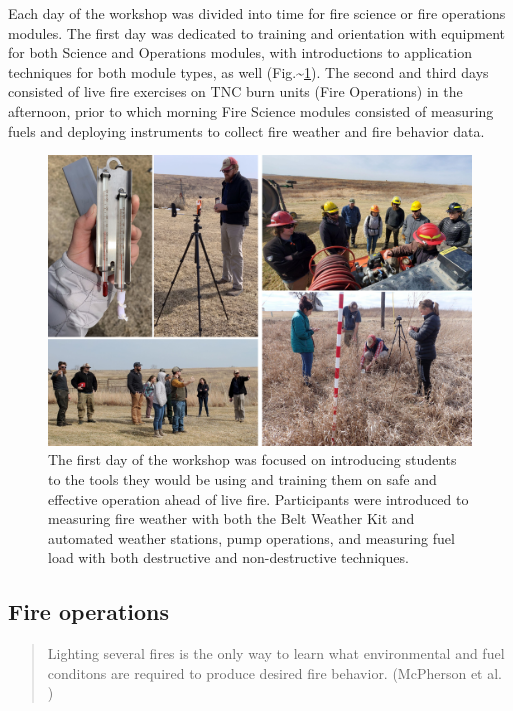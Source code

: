 \documentclass[fire,article,submit,moreauthors,pdftex]{Definitions/mdpi}
\begin{document}
Each day of the workshop was divided into time for fire science or fire operations modules.
The first day was dedicated to training and orientation with equipment for both Science and Operations modules, with introductions to application techniques for both module types, as well (Fig.\textasciitilde{}\ref{TrainingDay}).
The second and third days consisted of live fire exercises on TNC burn units (Fire Operations) in the afternoon, prior to which morning Fire Science modules consisted of measuring fuels and deploying instruments to collect fire weather and fire behavior data.

\begin{figure}
\centering
\includegraphics[width=1\columnwidth]{TrainingDay.pdf}
\caption{\label{TrainingDay}The first day of the workshop was focused on introducing students to the tools they would be using and training them on safe and effective operation ahead of live fire. Participants were introduced to measuring fire weather with both the Belt Weather Kit and automated weather stations, pump operations, and measuring fuel load with both destructive and non-destructive techniques.}
\end{figure}

\hypertarget{fire-operations}{%
\subsection{Fire operations}\label{fire-operations}}

\begin{quote}
Lighting several fires is the only way to learn what environmental and fuel conditons are required to produce desired fire behavior. (McPherson et al. \citep{mcpherson1986})
\end{quote}
\end{document}
